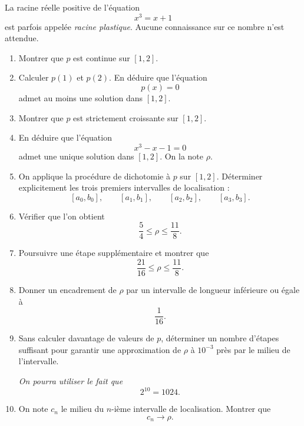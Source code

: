 \documentclass[11pt,a4paper]{article}
\begin{document}
La racine réelle positive de l'équation
\[
x^3=x+1
\]
est parfois appelée \emph{racine plastique}. Aucune connaissance sur ce nombre n'est attendue.

\begin{enumerate}[resume]
    \item Montrer que \(p\) est continue sur \([1,2]\).

    \item Calculer \(p(1)\) et \(p(2)\). En déduire que l'équation
    \[
    p(x)=0
    \]
    admet au moins une solution dans \([1,2]\).

    \item Montrer que \(p\) est strictement croissante sur \([1,2]\).

    \item En déduire que l'équation
    \[
    x^3-x-1=0
    \]
    admet une unique solution dans \([1,2]\). On la note \(\rho\).

    \item On applique la procédure de dichotomie à \(p\) sur \([1,2]\). Déterminer explicitement les trois premiers intervalles de localisation :
    \[
    [a_0,b_0],\qquad [a_1,b_1],\qquad [a_2,b_2],\qquad [a_3,b_3].
    \]

    \item Vérifier que l'on obtient
    \[
    \frac54\leq \rho\leq \frac{11}{8}.
    \]

    \item Poursuivre une étape supplémentaire et montrer que
    \[
    \frac{21}{16}\leq \rho\leq \frac{11}{8}.
    \]

    \item Donner un encadrement de \(\rho\) par un intervalle de longueur inférieure ou égale à
    \[
    \frac{1}{16}.
    \]

    \item Sans calculer davantage de valeurs de \(p\), déterminer un nombre d'étapes suffisant pour garantir une approximation de \(\rho\) à \(10^{-3}\) près par le milieu de l'intervalle.

    \medskip

    \emph{On pourra utiliser le fait que}
    \[
    2^{10}=1024.
    \]

    \item On note \(c_n\) le milieu du \(n\)-ième intervalle de localisation. Montrer que
    \[
    c_n\longrightarrow \rho.
    \]
\end{enumerate}

\end{document}
